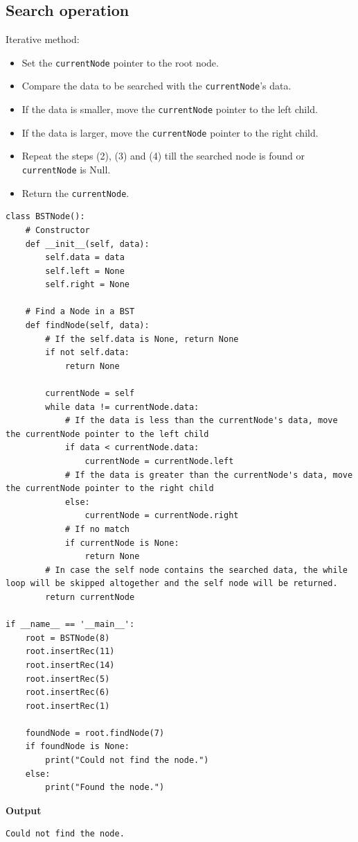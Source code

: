 \documentclass[a4paper,11pt]{book}
\begin{document}
\subsection{Search operation}

\noindent Iterative method:
\begin{itemize}
    \item Set the \lstinline{currentNode} pointer to the root node. 
    \item Compare the data to be searched with the \lstinline{currentNode}'s data.
    \item If the data is smaller, move the \lstinline{currentNode} pointer to the left child.
    \item If the data is larger, move the \lstinline{currentNode} pointer to the right child.
    \item Repeat the steps (2), (3) and (4) till the searched node is found or \lstinline{currentNode} is Null.
    \item Return the \lstinline{currentNode}.
\end{itemize}

\begin{lstlisting}
class BSTNode():
    # Constructor
    def __init__(self, data):
        self.data = data
        self.left = None
        self.right = None
       
    # Find a Node in a BST 
    def findNode(self, data):
        # If the self.data is None, return None
        if not self.data:
            return None
        
        currentNode = self
        while data != currentNode.data:
            # If the data is less than the currentNode's data, move the currentNode pointer to the left child
            if data < currentNode.data:
                currentNode = currentNode.left
            # If the data is greater than the currentNode's data, move the currentNode pointer to the right child
            else:
                currentNode = currentNode.right
            # If no match
            if currentNode is None: 
                return None
        # In case the self node contains the searched data, the while loop will be skipped altogether and the self node will be returned.
        return currentNode
        
if __name__ == '__main__':
    root = BSTNode(8)
    root.insertRec(11)
    root.insertRec(14)
    root.insertRec(5)
    root.insertRec(6)
    root.insertRec(1)
    
    foundNode = root.findNode(7)
    if foundNode is None:
        print("Could not find the node.")
    else:
        print("Found the node.")
\end{lstlisting}
\textbf{Output}
\begin{lstlisting}
Could not find the node.
\end{lstlisting}
\end{document}
